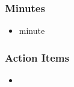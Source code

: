 		\subsubsection*{Minutes}
			\begin{itemize}
				\item minute
			\end{itemize}

		\subsubsection*{Action Items}
			\begin{itemize}
				\item
			\end{itemize}


